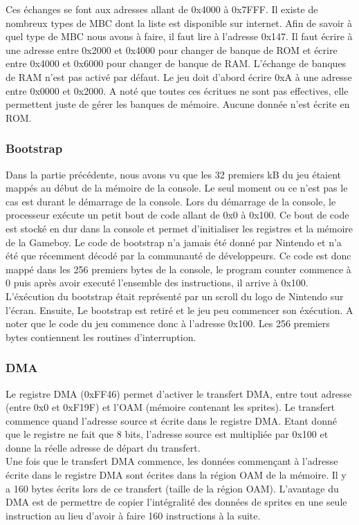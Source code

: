 \documentclass[a4paper]{article}
\begin{document}
Ces échanges se font aux adresses allant de 0x4000 à 0x7FFF. Il existe de nombreux 
types de MBC dont la liste est disponible sur internet. Afin de savoir à quel type 
de MBC nous avons à faire, il faut lire à l'adresse 0x147. Il faut écrire à une 
adresse entre 0x2000 et 0x4000 pour changer de banque de ROM et écrire entre 0x4000 
et 0x6000 pour changer de banque de RAM. L'échange de banques de RAM n'est pas activé 
par défaut. Le jeu doit d'abord écrire 0xA à une adresse entre 0x0000 et 0x2000. 
A noté que toutes ces écritues ne sont pas effectives, elle permettent juste de 
gérer les banques de mémoire. Aucune donnée n'est écrite en ROM.

\subsubsection{Bootstrap}
Dans la partie précédente, nous avons vu que les 32 premiers kB du jeu étaient mappés
au début de la mémoire de la console. Le seul moment ou ce n'est pas le cas est 
durant le démarrage de la console. Lors du démarrage de la console, le processeur
exécute un petit bout de code allant de 0x0 à 0x100. Ce bout de code est stocké en
dur dans la console et permet d'initialiser les registres et la mémoire de la Gameboy.
Le code de bootstrap n'a jamais été donné par Nintendo et n'a été que récemment
décodé par la communauté de développeurs. Ce code est donc mappé dans les 256 premiers
bytes de la console, le program counter commence à 0 puis après avoir executé l'ensemble
des instructions, il arrive à 0x100. L'éxécution du bootstrap était représenté par
un scroll du logo de Nintendo sur l'écran. Ensuite, Le bootstrap est retiré et le jeu peu
commencer son éxécution. A noter que le code du jeu commence donc à l'adresse
0x100. Les 256 premiers bytes contiennent les routines d'interruption.

\subsubsection{DMA}
Le registre DMA (0xFF46) permet d'activer le transfert DMA, entre tout adresse
(entre 0x0 et 0xF19F) et l'OAM (mémoire contenant les sprites). Le transfert commence
quand l'adresse source st écrite dans le registre DMA. Etant donné que le registre
ne fait que 8 bits, l'adresse source est multipliée par 0x100 et donne la réelle
adresse de départ du transfert. \\

Une fois que le transfert DMA commence, les données commençant à l'adresse
écrite dans le registre DMA sont écrites dans la région OAM de la mémoire.
Il y a 160 bytes écrits lors de ce transfert (taille de la région OAM).  L'avantage 
du DMA est de permettre de copier l'intégralité des données de sprites en une seule 
instruction au lieu d'avoir à faire 160 instructions à la suite.
\end{document}
